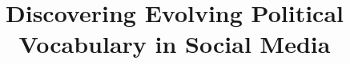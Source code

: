 \documentclass[conference]{IEEEtran}
\newcommand{\reviews}[1]{[{\color{magenta}\textit{reviews}\textit{: #1}}]}
\newcommand{\TODO}[2]{{\color{red}[\textbf{TODO:} #2 \textbf{Assignee:} #1]}}
\begin{document}

\title{Discovering Evolving Political Vocabulary in Social Media}

\maketitle
\end{document}
